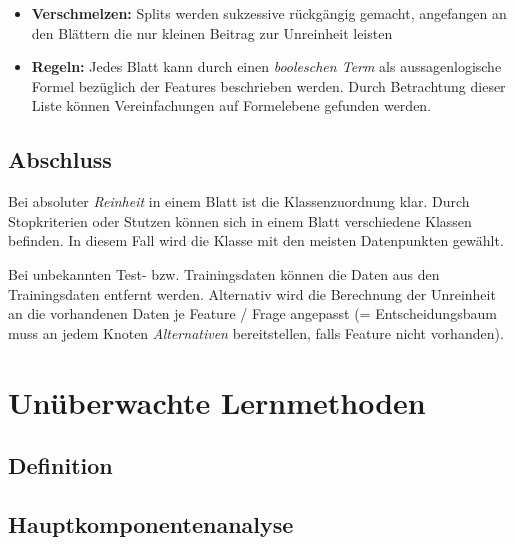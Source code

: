\documentclass{report}
\begin{document}
  \begin{itemize}	
    \item \textbf{Verschmelzen:} Splits werden sukzessive rückgängig gemacht, angefangen an den Blättern die nur kleinen	
    Beitrag zur Unreinheit leisten	
    \item \textbf{Regeln:} Jedes Blatt kann durch einen \textit{booleschen Term} als aussagenlogische Formel bezüglich der	
    Features beschrieben werden. Durch Betrachtung dieser Liste können Vereinfachungen auf Formelebene gefunden werden.	
  \end{itemize}	
  
  \section{Abschluss}	
  
  Bei absoluter \textit{Reinheit} in einem Blatt ist die Klassenzuordnung klar. Durch Stopkriterien oder Stutzen können sich in einem	
  Blatt verschiedene Klassen befinden. In diesem Fall wird die Klasse mit den meisten Datenpunkten gewählt.\par	
  
  Bei unbekannten Test- bzw. Trainingsdaten können die Daten aus den Trainingsdaten entfernt werden. Alternativ wird die	
  Berechnung der Unreinheit an die vorhandenen Daten je Feature / Frage angepasst (= Entscheidungsbaum muss an jedem Knoten	
  \textit{Alternativen} bereitstellen, falls Feature nicht vorhanden).	
  
\chapter{Unüberwachte Lernmethoden}

\section{Definition}

\section{Hauptkomponentenanalyse}

  
\end{document}
